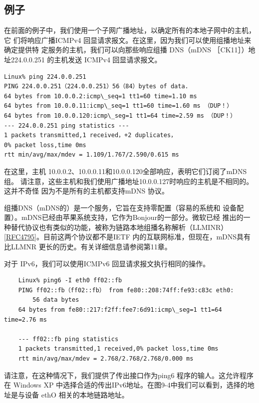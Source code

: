 \subsection{例子}
在前面的例子中，我们使用一个子网广播地址，以确定所有的本地子网中的主机，它
们将响应广播ICMPv4 回显请求报文。在这里，因为我们可以使用组播地址来确定提供特
定服务的主机，我们可以向那些响应组播 DNS（mDNS ［CK11］）地址224.0.0.251 的主机发送
ICMPv4 回显请求报文。

\begin{verbatim}
Linux% ping 224.0.0.251
PING 224.0.0.251（224.0.0.251）56（84）bytes of data.
64 bytes from 10.0.0.2:icmp\_seq=1 tt1=60 time=1.10 ms
64 bytes from 10.0.0.11:icmp\_seq=1 tt1=60 time=1.60 ms （DUP！）
64 bytes from 10.0.0.120:icmp\_seg=1 tt1=64 time=2.59 ms （DUP！）
--- 224.0.0.251 ping statistics ---
1 packets transmitted,1 received，+2 duplicates，
0% packet loss,time 0ms
rtt min/avg/max/mdev = 1.109/1.767/2.590/0.615 ms
\end{verbatim}

在这里，主机 10.0.0.2、10.0.0.11和10.0.0.120全部响应，表明它们订阅了mDNS组。
请注意，这些主机和我们使用广播地址10.0.0.127时响应的主机是不相同的。这并不奇怪
因为不是所有的主机都支持mDNS 协议。

\begin{tcolorbox}
    组播DNS（mDNS的）是一个服务，它旨在支持零配置（容易的系统和
    设备配置）。mDNS已经由苹果系统支持，它作为Bonjour的一部分。微软已经
    推出的一种替代协议也有类似的功能，被称为链路本地组播名称解析（LLMINR）
    \href{https://www.rfc-editor.org/rfc/rfc4795}{[RFC4795]}。目前这两个协议都不是IETF 内的互联网标准，但现在，mDNS具有
    比LLMNR 更长的历史。有关详细信息请参阅第11章。
\end{tcolorbox}

对于 IPv6，我们可以使用ICMPv6 回显请求报文执行相同的操作。

\begin{verbatim}
    Linux% ping6 -I eth0 ff02::fb
    PING ff02::fb（ff02::fb） from fe80::208:74ff:fe93:c83c eth0:
        56 data bytes
    64 bytes from fe80::217:f2ff:fee7:6d91:icmp\_seg=1 tt1=64 time=2.76 ms

    --- ff02::fb ping statistics
    1 packets transmitted,1 received,0% packet loss,time 0ms
    rtt min/avg/max/mdev = 2.768/2.768/2.768/0.000 ms
\end{verbatim}

请注意，在这种情况下，我们提供了传出接口作为ping6 程序的输人。这允许程序在
Windows XP 中选择合适的传出IPv6地址。在图9-4中我们可以看到，选择的地址是与设备
ethO 相关的本地链路地址。

